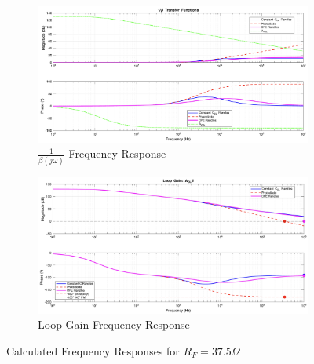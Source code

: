 \begin{figure}[H]
    \centering
    \begin{subfigure}[b]{0.5\textwidth}
        \centering
        \includegraphics[width=\textwidth]{MatLabBeta_37,5.png}
        \caption{$\frac{1}{\beta(j\omega)}$ Frequency Response}
        \label{fig:matlab_beta_37.5}
    \end{subfigure}\hfill
    \begin{subfigure}[b]{0.5\textwidth}
        \centering
        \includegraphics[width=\textwidth]{MatLabLG_37,5.png}
        \caption{Loop Gain Frequency Response}
        \label{fig:matlab_cl_37.5}
    \end{subfigure}
    \caption{Calculated Frequency Responses for $R_F=37.5\Omega$}
    \label{fig:matlab_37.5}
\end{figure}
